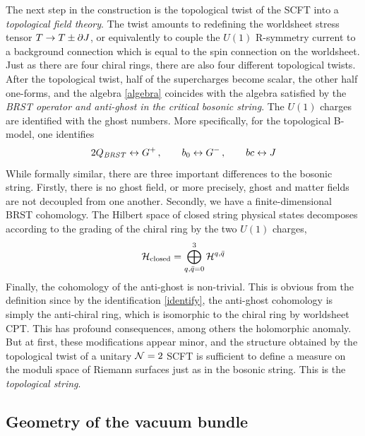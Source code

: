 The next step in the construction is the topological twist of 
the SCFT into a {\it topological field theory}. The twist 
amounts to redefining the worldsheet stress tensor $T\to T\pm \partial J$,
or equivalently to couple the $U(1)$ R-symmetry current to a background
connection which is equal to the spin connection on the worldsheet.
Just as there are four chiral rings, there are also four different
topological twists. After the topological twist, half of the supercharges
become scalar, the other half one-forms, and the algebra \eqref{algebra} 
coincides with the algebra satisfied by the {\it BRST operator and anti-ghost
in the critical bosonic string}. The $U(1)$ charges are identified with 
the ghost numbers. More specifically, for the topological B-model, one 
identifies
\begin{equation}
\eqlabel{identify}
2 Q_{{\it BRST}} \leftrightarrow G^+\,,
\qquad b_0 \leftrightarrow G^-\,,
\qquad bc \leftrightarrow J
\end{equation}
While formally similar, there are three important differences to the
bosonic string. Firstly, there is no ghost field, or more precisely, 
ghost and matter fields are not decoupled from one another. Secondly,
we have a finite-dimensional BRST cohomology. The Hilbert space of 
closed string physical states decomposes according to the grading of 
the chiral ring by the two $U(1)$ charges,
\begin{equation}
\eqlabel{hilbert}
\calh_{\rm closed} = \bigoplus_{q,\qb=0}^3 \calh^{q,\qb}
\end{equation}
Finally, the cohomology of the anti-ghost is non-trivial. This is obvious
from the definition since by the identification \eqref{identify}, the 
anti-ghost cohomology is simply the anti-chiral ring, which is isomorphic 
to the chiral ring by worldsheet CPT. This has profound consequences,
among others the holomorphic anomaly. But at first, these modifications 
appear minor, and the structure obtained by the topological twist of a 
unitary ${\cal N}=2$ SCFT is sufficient to define a measure on the moduli 
space of Riemann surfaces just as in the bosonic string. This is the 
{\it topological string}.


\subsection{Geometry of the vacuum bundle}
\label{vacgeo1}

